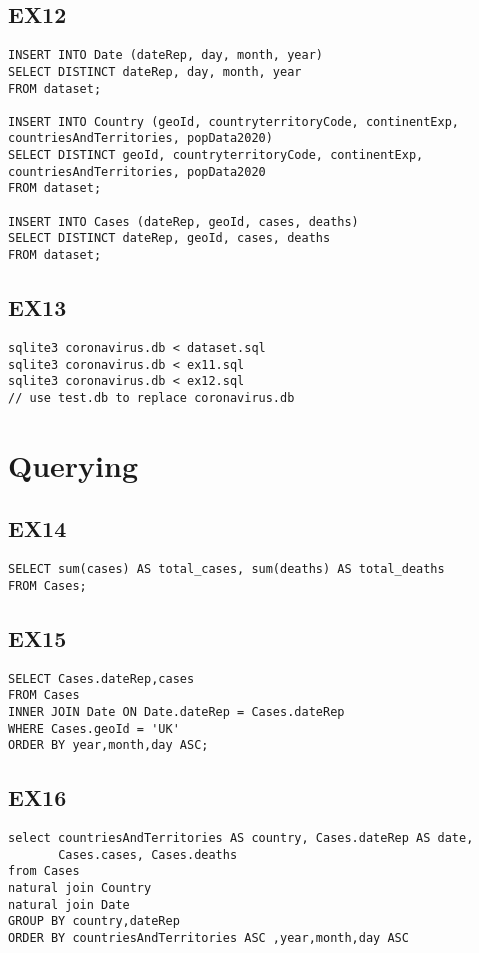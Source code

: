 \documentclass[]{article}
\begin{document}
\subsection{EX12}
\begin{verbatim}
INSERT INTO Date (dateRep, day, month, year)
SELECT DISTINCT dateRep, day, month, year
FROM dataset;

INSERT INTO Country (geoId, countryterritoryCode, continentExp, countriesAndTerritories, popData2020)
SELECT DISTINCT geoId, countryterritoryCode, continentExp, countriesAndTerritories, popData2020
FROM dataset;

INSERT INTO Cases (dateRep, geoId, cases, deaths)
SELECT DISTINCT dateRep, geoId, cases, deaths
FROM dataset;
\end{verbatim}

\subsection{EX13}
\begin{verbatim}
sqlite3 coronavirus.db < dataset.sql
sqlite3 coronavirus.db < ex11.sql
sqlite3 coronavirus.db < ex12.sql  
// use test.db to replace coronavirus.db
\end{verbatim}


\section{Querying}
\subsection{EX14}
\begin{verbatim}
SELECT sum(cases) AS total_cases, sum(deaths) AS total_deaths
FROM Cases;
\end{verbatim}

\subsection{EX15}
\begin{verbatim}
SELECT Cases.dateRep,cases
FROM Cases
INNER JOIN Date ON Date.dateRep = Cases.dateRep
WHERE Cases.geoId = 'UK'
ORDER BY year,month,day ASC;
\end{verbatim}

\subsection{EX16}
\begin{verbatim}
select countriesAndTerritories AS country, Cases.dateRep AS date,
       Cases.cases, Cases.deaths
from Cases
natural join Country
natural join Date
GROUP BY country,dateRep
ORDER BY countriesAndTerritories ASC ,year,month,day ASC
\end{verbatim}
\end{document}

